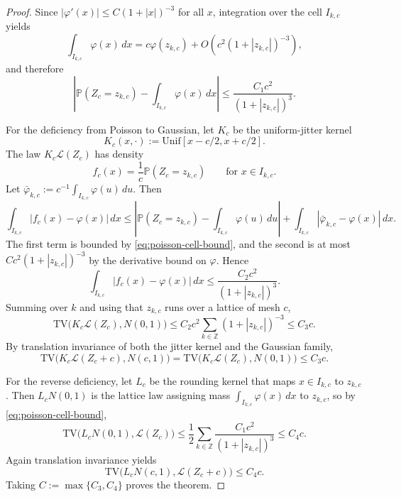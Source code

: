 \documentclass[10pt,a4paper]{amsart}
\newcommand{\Pbb}{\mathbb P}
\newcommand{\TV}{\mathrm{TV}}
\begin{document}
\begin{proof}
Since $|\varphi'(x)|\le C(1+|x|)^{-3}$ for all $x$, integration over the cell $I_{k,c}$ yields
\[
\int_{I_{k,c}}\varphi(x)\,dx
=
c\varphi(z_{k,c})+O\!\left(c^2(1+|z_{k,c}|)^{-3}\right),
\]
and therefore
\begin{equation}
\left|\Pbb(Z_c=z_{k,c})-\int_{I_{k,c}}\varphi(x)\,dx\right|
\le \frac{C_1c^2}{(1+|z_{k,c}|)^3}.
\label{eq:poisson-cell-bound}
\end{equation}

For the deficiency from Poisson to Gaussian, let $K_c$ be the uniform-jitter kernel
\[
K_c(x,\cdot):=\mathrm{Unif}[x-c/2,x+c/2].
\]
The law $K_c\mathcal L(Z_c)$ has density
\[
f_c(x)=\frac{1}{c}\Pbb(Z_c=z_{k,c})\qquad \text{for }x\in I_{k,c}.
\]
Let $\bar\varphi_{k,c}:=c^{-1}\int_{I_{k,c}}\varphi(u)\,du$. Then
\[
\int_{I_{k,c}}|f_c(x)-\varphi(x)|\,dx
\le \left|\Pbb(Z_c=z_{k,c})-\int_{I_{k,c}}\varphi(u)\,du\right|
+\int_{I_{k,c}}|\bar\varphi_{k,c}-\varphi(x)|\,dx.
\]
The first term is bounded by \eqref{eq:poisson-cell-bound}, and the second is at most
$Cc^2(1+|z_{k,c}|)^{-3}$ by the derivative bound on $\varphi$. Hence
\[
\int_{I_{k,c}}|f_c(x)-\varphi(x)|\,dx\le \frac{C_2c^2}{(1+|z_{k,c}|)^3}.
\]
Summing over $k$ and using that $z_{k,c}$ runs over a lattice of mesh $c$,
\[
\TV\bigl(K_c\mathcal L(Z_c),N(0,1)\bigr)
\le C_2c^2\sum_{k\in\mathbb Z}(1+|z_{k,c}|)^{-3}
\le C_3c.
\]
By translation invariance of both the jitter kernel and the Gaussian family,
\[
\TV\bigl(K_c\mathcal L(Z_c+c),N(c,1)\bigr)
=\TV\bigl(K_c\mathcal L(Z_c),N(0,1)\bigr)
\le C_3c.
\]

For the reverse deficiency, let $L_c$ be the rounding kernel that maps $x\in I_{k,c}$ to $z_{k,c}$. Then
$L_cN(0,1)$ is the lattice law assigning mass $\int_{I_{k,c}}\varphi(x)\,dx$ to $z_{k,c}$, so by
\eqref{eq:poisson-cell-bound},
\[
\TV\bigl(L_cN(0,1),\mathcal L(Z_c)\bigr)
\le \frac12\sum_{k\in\mathbb Z}\frac{C_1c^2}{(1+|z_{k,c}|)^3}
\le C_4c.
\]
Again translation invariance yields
\[
\TV\bigl(L_cN(c,1),\mathcal L(Z_c+c)\bigr)\le C_4c.
\]
Taking $C:=\max\{C_3,C_4\}$ proves the theorem.
\end{proof}
\end{document}
